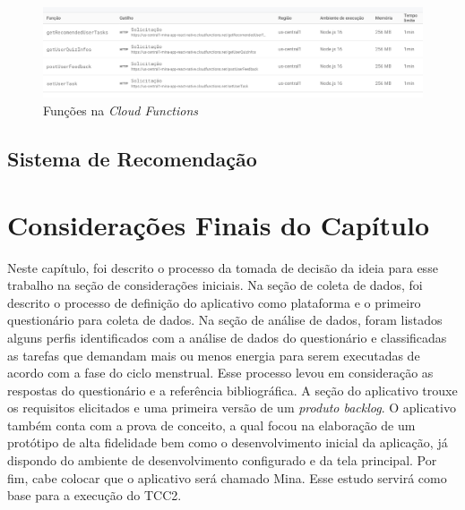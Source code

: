 \begin{figure}[ht]
    \centering
    \includegraphics[keepaspectratio=true,scale=0.42]{figuras/funcoes.png}
    \caption{Funções na \emph{Cloud Functions}}
        \label{fig14}
\end{figure}
\subsection{Sistema de Recomendação}

\section{Considerações Finais do Capítulo}

Neste capítulo, foi descrito o processo da tomada de decisão 
da ideia para 
esse trabalho na seção de considerações iniciais. Na seção 
de coleta de dados, 
foi descrito o processo de definição do aplicativo como 
plataforma e o primeiro questionário 
para coleta de dados. Na seção de análise de dados, foram 
listados alguns perfis identificados 
com a análise de dados do questionário e classificadas as 
tarefas que demandam mais ou menos energia 
para serem executadas de acordo com a fase do ciclo menstrual. 
Esse processo levou em consideração 
as respostas do questionário e a referência bibliográfica. 
A seção do aplicativo trouxe os requisitos elicitados e 
uma primeira versão de um \emph{produto backlog}. O aplicativo também conta 
com a prova de conceito, a qual focou na elaboração de um protótipo de alta fidelidade 
bem como o desenvolvimento 
inicial 
da aplicação, já dispondo do ambiente de desenvolvimento configurado e da tela 
principal. Por fim, cabe colocar que o aplicativo será chamado Mina. Esse estudo servirá como base para a execução 
do TCC2.
